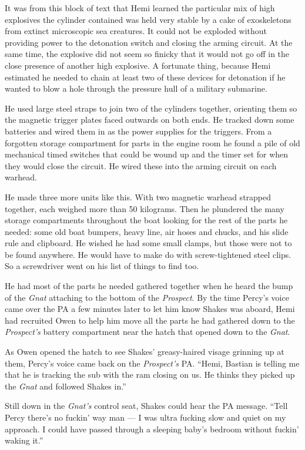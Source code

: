 \documentclass[
]{scrbook}
\begin{document}
It was from this block of text that Hemi learned the particular mix of
high explosives the cylinder contained was held very stable by a cake of
exoskeletons from extinct microscopic sea creatures. It could not be
exploded without providing power to the detonation switch and closing
the arming circuit. At the same time, the explosive did not seem so
finicky that it would not go off in the close presence of another high
explosive. A fortunate thing, because Hemi estimated he needed to chain
at least two of these devices for detonation if he wanted to blow a hole
through the pressure hull of a military submarine.

He used large steel straps to join two of the cylinders together,
orienting them so the magnetic trigger plates faced outwards on both
ends. He tracked down some batteries and wired them in as the power
supplies for the triggers. From a forgotten storage compartment for
parts in the engine room he found a pile of old mechanical timed
switches that could be wound up and the timer set for when they would
close the circuit. He wired these into the arming circuit on each
warhead.

He made three more units like this. With two magnetic warhead strapped
together, each weighed more than 50 kilograms. Then he plundered the
many storage compartments throughout the boat looking for the rest of
the parts he needed: some old boat bumpers, heavy line, air hoses and
chucks, and his slide rule and clipboard. He wished he had some small
clamps, but those were not to be found anywhere. He would have to make
do with screw-tightened steel clips. So a screwdriver went on his list
of things to find too.

He had most of the parts he needed gathered together when he heard the
bump of the \emph{Gnat} attaching to the bottom of the \emph{Prospect}.
By the time Percy's voice came over the PA a few minutes later to let
him know Shakes was aboard, Hemi had recruited Owen to help him move all
the parts he had gathered down to the \emph{Prospect's} battery
compartment near the hatch that opened down to the \emph{Gnat}.

As Owen opened the hatch to see Shakes' greasy-haired visage grinning up
at them, Percy's voice came back on the \emph{Prospect's} PA. ``Hemi,
Bastian is telling me that he is tracking the sub with the ram closing
on us. He thinks they picked up the \emph{Gnat} and followed Shakes
in.''

Still down in the \emph{Gnat's} control seat, Shakes could hear the PA
message. ``Tell Percy there's no fuckin' way man --- I was ultra fucking
slow and quiet on my approach. I could have passed through a sleeping
baby's bedroom without fuckin' waking it.''
\end{document}
